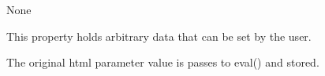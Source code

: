 \documentclass[letterpaper,10pt,english]{sphinxmanual}
\begin{document}
\begin{fulllineitems}

\begin{fulllineitems}
\label{api:qwt.PointLinePlot.start_line}
None

\end{fulllineitems}


\begin{fulllineitems}
\label{api:qwt.PointLinePlot.user}
This property holds arbitrary data that can be set by the user.

The original html parameter value is passes to eval() and stored.

\end{fulllineitems}


\end{fulllineitems}

\end{document}
